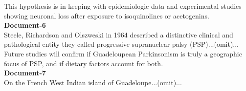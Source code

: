 \documentclass[10pt, a4paper, logo]{googledeepmind} %
\begin{document}
\begin{tcolorbox}
\begin{flushleft}
This hypothesis is in keeping with epidemiologic data and experimental studies showing neuronal loss after exposure to isoquinolines or acetogenins.
\\
\vspace{1em}
\textbf{Document-6}
\\
Steele, Richardson and Olszweski in 1964 described a distinctive clinical and pathological entity they called progressive supranuclear palsy (PSP)...(omit)...
Future studies will confirm if Guadeloupean Parkinsonism is truly a geographic focus of PSP, and if dietary factors account for both.
\\
\vspace{1em}
\textbf{Document-7}
\\
On the French West Indian island of Guadeloupe...(omit)...

\end{flushleft}
\end{tcolorbox}
\end{document}
